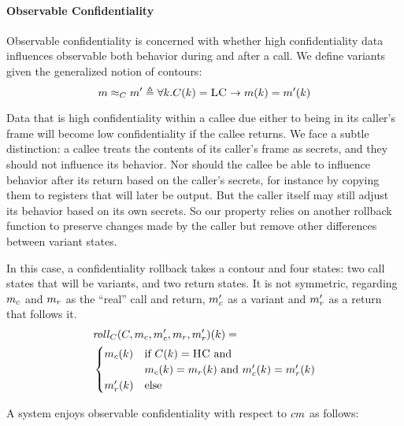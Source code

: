 \documentclass[conference]{IEEEtran}
\begin{document}
    \paragraph{Observable Confidentiality}

      Observable confidentiality is concerned with whether high confidentiality data influences
      observable both behavior during and after a call. We define variants given the generalized notion
      of contours:
      \[m \approx_C m' \triangleq \forall k .
        C(k) = \textsc{LC} \rightarrow m(k) = m'(k)\]

      Data that is high confidentiality within a callee due either to being in its caller's frame
      will become low confidentiality if the callee returns. We face a subtle distinction: 
      a callee treats the contents of its caller's frame as secrets, and they should not influence
      its behavior. Nor should the callee be able to influence behavior after its return based
      on the caller's secrets, for instance by copying them to registers that will later be output.
      But the caller itself may still adjust its behavior based on its own secrets. So our property
      relies on another rollback function to preserve changes made by the caller but remove other
      differences between variant states.

      In this case, a confidentiality rollback takes a contour and four states: two call states
      that will be variants, and two return states. It is not symmetric, regarding \(m_c\) and \(m_r\)
      as the ``real'' call and return, \(m_c'\) as a variant and \(m_r'\) as a return that follows it.
      \[\begin{split}
        & \mathit{roll}_C(C,m_c,m_c',m_r,m_r')(k) = \\
        & \begin{cases}
          m_c(k) & \text{if } C(k) = \textsc{HC} \text{ and } \\
                  & m_c(k) = m_r(k) \text{ and }
                    m_c'(k) = m_r'(k) \\
          m_r'(k) & \text{else} \\
        \end{cases}
      \end{split}\]

      A system enjoys observable confidentiality with respect to \(cm\) as follows:
\end{document}
